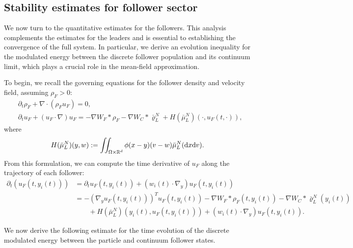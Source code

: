 \documentclass[10pt, reqno]{amsart}
\theoremstyle{definition}
\theoremstyle{remark}
\numberwithin{equation}{section}
\newcommand{\dx}{\textnormal{d}x}
\newcommand{\dv}{\textnormal{d}v}
\newcommand{\R}{\mathbb{R}}
\newcommand{\p}{\partial}
\begin{document}
%
%
%
%
%
%


\subsection{Stability estimates for follower sector}
We now turn to the quantitative estimates for the followers. This analysis complements the estimates for the leaders and is essential to establishing the convergence of the full system. In particular, we derive an evolution inequality for the modulated energy between the discrete follower population and its continuum limit, which plays a crucial role in the mean-field approximation.

To begin, we recall the governing equations for the follower density and velocity field, assuming $\rho_F > 0$:
\begin{align*}
&    \p_t \rho_F + \nabla\cdot (\rho_F  u_F) = 0,\\
&    \p_t  u_F + (u_F \cdot \nabla)u_F =  - \nabla W_F *  \rho_F - \nabla W_C *  \bar \varrho_L^N + H(\bar \mu_L^N)(\cdot, u_F(t,\cdot)),
\end{align*}
where
\[
H(\bar\mu_L^N)(y,w) := \iint_{\Omega\times\R^d} \phi(x-y) (v-w)\bar\mu_L^N(\dx\dv).
\]
From this formulation, we can compute the time derivative of $u_F$ along the trajectory of each follower:
\begin{equation} \label{eq: pt u}
\begin{split}
   \p_t (u_F(t,y_i(t)))  
    &= \p_t u_F(t,y_i(t)) + (w_i(t) \cdot \nabla_y)  u_F(t,y_i(t)) \\
    &=  - (\nabla_y u_F(t,y_i(t)))^T  u_F(t,y_i(t)) - \nabla W_F *  \rho_F(t,y_i(t)) - \nabla W_C *  \bar \varrho_L^N  (y_i(t)) \\
    &\qquad + H(\bar\mu_L^N)(y_i(t), u_F(t,y_i(t)))  + (w_i(t) \cdot \nabla_y ) u_F(t,y_i(t)).
\end{split}
\end{equation}

We now derive the following estimate for the time evolution of the discrete modulated energy between the particle and continuum follower states. 
\end{document}

